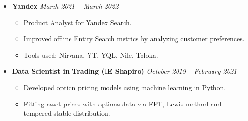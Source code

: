 \documentclass[12pt]{article}   %
\begin{document}
\begin{itemize}
    \item \textbf{Yandex} \hfill \textit{March 2021 -- March 2022}
    \begin{itemize}
        \item Product Analyst for Yandex Search.
        \item Improved offline Entity Search metrics by analyzing customer preferences.
        \item Tools used: Nirvana, YT, YQL, Nile, Toloka.
    \end{itemize}

    \item \textbf{Data Scientist in Trading (IE Shapiro)} \hfill \textit{October 2019 -- February 2021}
    \begin{itemize}
        \item Developed option pricing models using machine learning in Python.
        \item Fitting asset prices with options data via FFT, Lewis method and tempered stable distribution.

    \end{itemize}

\end{itemize}

\vspace{1em}
\end{document}
